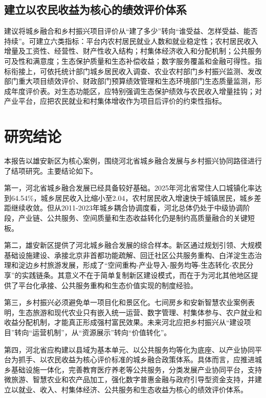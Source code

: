 \documentclass[UTF8,zihao=-4]{ctexart}
\begin{document}
\subsection{建立以农民收益为核心的绩效评价体系}

建议将城乡融合和乡村振兴项目评价从“建了多少”转向“谁受益、怎样受益、能否持续”。可建立六类指标：平台内农村居民就业人数和就业稳定性；农村居民收入增量及工资性、经营性、财产性收入结构；村集体经济收入和分配机制；公共服务可及性和满意度；生态保护质量和生态补偿收益；数字服务覆盖和金融可得性。指标衔接上，可依托统计部门城乡居民收入调查、农业农村部门乡村振兴监测、发改部门重大项目绩效评价、财政部门预算绩效管理和生态环境部门生态质量监测，形成年度评价表。对生态功能区，应特别强调生态保护绩效与农民收入增量挂钩；对产业平台，应把农民就业和村集体增收作为项目后评价的约束性指标。

\section{研究结论}

本报告以雄安新区为核心案例，围绕河北省城乡融合发展与乡村振兴协同路径进行了结项研究。主要结论如下。

第一，河北省城乡融合发展已经具备较好基础。2025年河北省常住人口城镇化率达到64.54\%，城乡居民收入比缩小至2.04，农村居民收入增速快于城镇居民，城乡差距继续收敛。但从2011-2023年城乡耦合协调度看，河北总体仍处于中级协调阶段，产业链、公共服务、空间质量和生态收益转化仍是制约高质量融合的关键短板。

第二，雄安新区提供了河北城乡融合发展的综合样本。新区通过规划引领、大规模基础设施建设、承接北京非首都功能疏解、回迁社区公共服务重构、白洋淀生态治理和淀边乡村旅游发展，形成了“空间重构-产业导入-服务均等-生态转化-农民分享”的实践链条。其意义不在于简单复制新区建设模式，而在于为河北其他地区提供了平台化承接、公共服务重构和生态价值实现的制度经验。

第三，乡村振兴必须避免单一项目化和景区化。七间房乡和安新智慧农业案例表明，生态旅游和现代农业只有嵌入统一运营、数字管理、村集体参与、农户就业和收益分配机制，才能真正形成强村富民效果。未来河北应把乡村振兴从“建设项目”转向“运营机制”，从“资源展示”转向“价值转化”。

第四，河北省应构建以县域为基本单元、以公共服务均等化为底座、以产业协同平台为抓手、以农民收益为核心评价标准的城乡融合政策体系。具体而言，应推进城乡基础设施一体化，完善教育医疗养老等公共服务，分类发展产业协同平台，支持微旅游、智慧农业和农产品加工，强化数字普惠金融与政府引导型资金支持，并建立以就业、收入、村集体经济、公共服务和生态收益为核心的绩效评价体系。
\end{document}
